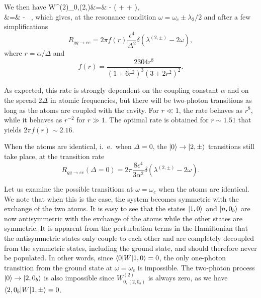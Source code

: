 We then have
\bea
W^{(2)}_{0,(2,\pm)}&=& - \left( +  +  \right), \\
&=& - \, ,
\eea
which gives, at the resonance condition $\omega = \omega_c \pm \lambda_2/2$ and after a few simplifications
\begin{equation}
    \label{Pggee2}
    R_{gg \rightarrow ee} = 2 \pi f(r) \frac{\epsilon^4}{\Delta^2} \delta(\lambda^{(2,\pm)} - 2\omega),
\end{equation}
where $r = \alpha/\Delta$ and
\begin{equation}
    f(r) = \frac{2304 r^8}{(1 + 6 r^2)^3 (3 + 2 r^2)^2}.
\end{equation}

As expected, this rate is strongly dependent on the coupling constant $\alpha$ and on the spread $2 \Delta$ in atomic frequencies, but there will be two-photon transitions as long as the atoms are coupled with the cavity. For $r \ll 1$, the rate behaves as $r^8$, while it behaves as $r^{-2}$ for $r \gg 1$. The optimal rate is obtained for $r \sim 1.51$ that yields $2 \pi f(r) \sim 2.16$.

When the atoms are identical, i.~e.~when $\Delta=0$, the $| 0 \rangle \rightarrow | 2,\pm \rangle$ transitions still take place, at the transition rate
\[R_{gg \rightarrow ee} (\Delta=0)= 2 \pi \frac{8 \epsilon^4}{3 \alpha^2} \delta(\lambda^{(2,\pm)} - 2\omega). \]

Let us examine the possible transitions at $\omega=\omega_c$ when the atoms are identical. We note that when this is the case, the system becomes symmetric with the exchange of the two atoms. It is easy to see that the states $| 1,0 \rangle$ and $| n,0_b \rangle$ are now antisymmetric with the exchange of the atoms while the other states are symmetric. It is apparent from the perturbation terms in the Hamiltonian that the antisymmetric states only couple to each other and are completely decoupled from the symmetric states, including the ground state, and should therefore never be populated. In other words, since $\langle 0 | W | 1,0 \rangle=0$, the only one-photon transition from the ground state at $\omega=\omega_c$ is impossible. The two-photon process $| 0 \rangle \rightarrow | 2,0_b \rangle$ is also impossible since $W^{(2)}_{0,(2,0_{b})}$ is always zero, as we have $\langle 2,0_b | W | 1,\pm \rangle=0$.

